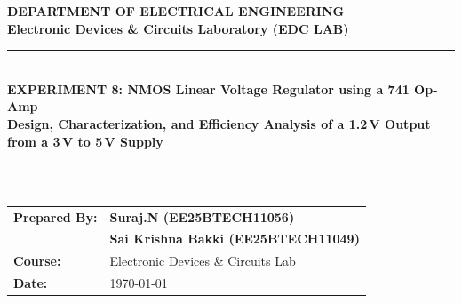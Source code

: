 \documentclass[11pt,a4paper]{article}
\begin{document}
\begin{center}
    {\LARGE \textbf{\color{primary} DEPARTMENT OF ELECTRICAL ENGINEERING}}\\[0.2cm]
    {\large \textbf{Electronic Devices \& Circuits Laboratory (EDC LAB)}}\\[0.4cm]
    \rule{\linewidth}{1pt}\\[0.3cm]
    {\Large \textbf{EXPERIMENT 8: NMOS Linear Voltage Regulator using a 741 Op-Amp}}\\[0.2cm]
    {\large \textbf{Design, Characterization, and Efficiency Analysis of a 1.2\,V Output from a 3\,V to 5\,V Supply}}\\[0.3cm]
    \rule{\linewidth}{1pt}\\[0.4cm]
    
    \begin{tabular}{ll}
        \textbf{Prepared By:} & \textbf{Suraj.N (EE25BTECH11056)} \\
                              & \textbf{Sai Krishna Bakki (EE25BTECH11049)} \\
        \textbf{Course:}      & Electronic Devices \& Circuits Lab \\
        \textbf{Date:}        & \today
    \end{tabular}
\end{center}

\vspace{0.2cm}
\end{document}

